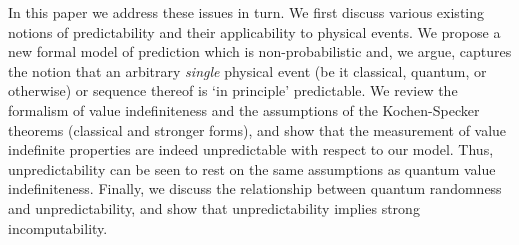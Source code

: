 \documentclass[%
 superscriptaddress,
 preprint,
 showpacs,
 showkeys,
 preprintnumbers,
  amsmath,amssymb,
  aps,
 pra,
  longbibliography,
  floatfix,
 ]{revtex4-1}
\theoremstyle{definition}
\begin{document}
In this paper we address these issues in turn.
We first discuss various existing notions of predictability and their applicability to physical events.
We propose a new formal model of prediction which is non-probabilistic and, we argue, captures the notion that an arbitrary {\em \color{green} single} physical event (be it classical, quantum, or otherwise) or sequence thereof is `in principle' predictable.
We review the formalism of value indefiniteness and the assumptions of the Kochen-Specker theorems (classical and stronger forms), and show that the measurement of value indefinite properties are indeed unpredictable with respect to our model.
Thus, unpredictability can be seen to rest on the same assumptions as quantum value indefiniteness.
Finally, we discuss the relationship between quantum randomness and unpredictability, and show that unpredictability implies strong incomputability.


\end{document}
